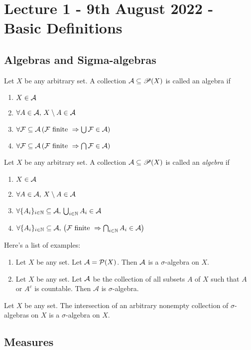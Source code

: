 \section{Lecture 1 - 9th August 2022 - Basic Definitions}
\subsection{Algebras and Sigma-algebras}
\begin{definition}[Algebra]
Let $X$ be any arbitrary set. A collection ${\cal A} \subseteq \mathscr P (X)$ is called an algebra if 
\begin{enumerate}
    \item $X\in {\cal A}$
    \item $\forall A \in {\cal A},\, X\setminus A \in {\cal A}$
    \item $\forall {\cal F} \subseteq {\cal A} \left( {\cal F} \text{ finite } \Rightarrow \bigcup {\cal F} \in {\cal A} \right)$
    \item $\forall {\cal F} \subseteq {\cal A} \left( {\cal F} \text{ finite } \Rightarrow \bigcap {\cal F} \in {\cal A} \right)$
\end{enumerate}
\end{definition}

\begin{definition}
Let $X$ be any arbitrary set. A collection ${\cal A} \subseteq \mathscr P (X)$ is called an \textit{algebra} if 
\begin{enumerate}
    \item $X\in {\cal A}$
    \item $\forall A \in {\cal A},\, X\setminus A \in {\cal A}$
    \item $\forall \{ A_i \}_{i\in\mathbb N} \subseteq \mathcal{A}, \,  \bigcup_{i\in \mathbb N} A_i  \in {\cal A} $
    \item $\forall \{ A_i \}_{i\in\mathbb N} \subseteq \mathcal{A},\, \left( {\cal F} \text{ finite } \Rightarrow \bigcap_{i\in\mathbb N} A_i\in {\cal A} \right)$
\end{enumerate}
\end{definition}

\begin{example} Here's a list of examples:
\begin{enumerate}
    \item Let $X$ be any set. Let ${\cal A} ={\cal P} (X)$. Then ${\cal A}$ is a $\sigma$-algebra on $X$.
    \item Let $X$ be any set. Let ${\cal A}$ be the collection of all subsets $A$ of $X$ such that $A$ or $A^c$ is countable. Then $\mathcal{A}$ is $\sigma$-algebra.
\end{enumerate}
\end{example}

\begin{proposition}
Let $X$ be any set. The intersection of an arbitrary nonempty collection of $\sigma$-algebras on $X$ is a $\sigma$-algebra on $X$.
\end{proposition}


\subsection{Measures}
\begin{example}

\end{example}
